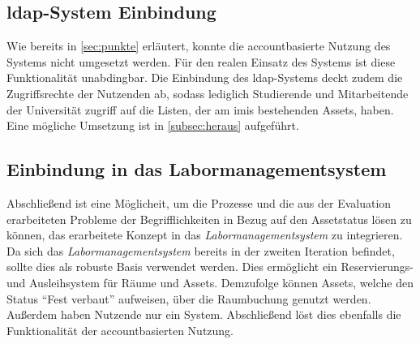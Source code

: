 \subsection{\ac{ldap}-System Einbindung}
Wie bereits in \ref{sec:punkte} erläutert, konnte die accountbasierte Nutzung des Systems nicht
umgesetzt werden. Für den realen Einsatz des Systems ist diese Funktionalität unabdingbar. Die
Einbindung des  \ac{ldap}-Systems deckt zudem die Zugriffsrechte der Nutzenden ab, sodass lediglich
Studierende und Mitarbeitende der Universität zugriff auf die Listen, der am \ac{imis} bestehenden Assets, haben. Eine
mögliche Umsetzung ist in \ref{subsec:heraus} aufgeführt.

\subsection{Einbindung in das Labormanagementsystem}
Abschließend ist eine Möglicheit, um die Prozesse und die aus der Evaluation erarbeiteten Probleme
der Begrifflichkeiten in Bezug auf den Assetstatus lösen zu können, das erarbeitete Konzept in das
\textit{Labormanagementsystem} \cite{Pabst2022} zu integrieren. Da sich das
\textit{Labormanagementsystem} bereits in der zweiten Iteration befindet, sollte dies als robuste
Basis verwendet werden. Dies ermöglicht ein Reservierungs- und Ausleihsystem für Räume und Assets.
Demzufolge können Assets, welche den Status \enquote{Fest verbaut} aufweisen, über die Raumbuchung
genutzt werden. Außerdem haben Nutzende nur ein System. Abschließend löst dies ebenfalls die
Funktionalität der accountbasierten Nutzung.


